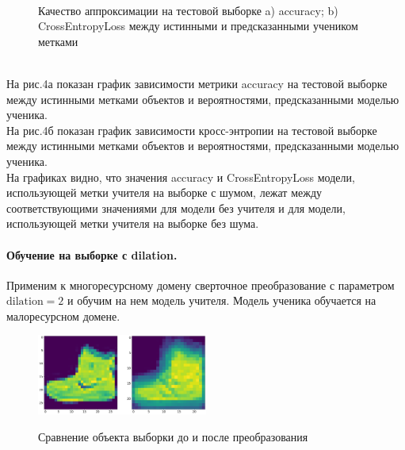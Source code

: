 \begin{figure}[h!t]\center
{}
\\
\caption{Качество аппроксимации на тестовой выборке a) accuracy; b) CrossEntropyLoss между истинными и предсказанными учеником метками}
\end{figure}\\
На рис.4а показан график зависимости метрики accuracy на тестовой выборке между истинными метками объектов и вероятностями, предсказанными моделью ученика.\\
На рис.4б показан график зависимости кросс-энтропии на тестовой выборке между истинными метками объектов и вероятностями, предсказанными моделью ученика.\\
На графиках видно, что значения accuracy и CrossEntropyLoss модели, использующей метки учителя на выборке с шумом, лежат между соответствующими значениями для модели без учителя и для модели, использующей метки учителя на выборке без шума.

\paragraph{Обучение на выборке с dilation.}
Применим к многоресурсному домену сверточное преобразование с параметром $\text{dilation}=2$ и обучим на нем модель учителя. Модель ученика обучается на малоресурсном домене.\\
\begin{figure}[h!t]\center
{\includegraphics[width=0.5\textwidth]{results/dilation}}
\caption{Сравнение объекта выборки до и после преобразования}
\end{figure}\\

